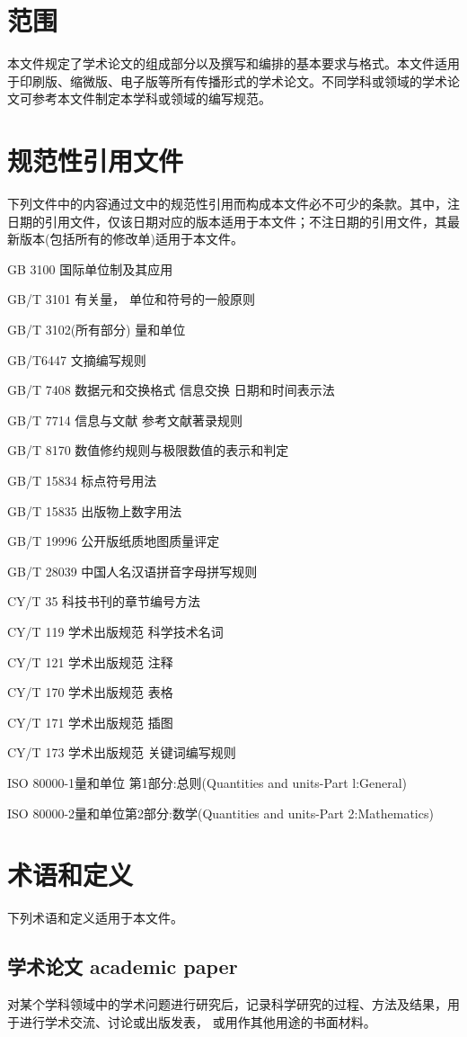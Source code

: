 \chapter{范围}

本文件规定了学术论文的组成部分以及撰写和编排的基本要求与格式。本文件适用于印刷版、缩微版、电子版等所有传播形式的学术论文。不同学科或领域的学术论文可参考本文件制定本学科或领域的编写规范。

\chapter{规范性引用文件}
下列文件中的内容通过文中的规范性引用而构成本文件必不可少的条款。其中，注日期的引用文件，仅该日期对应的版本适用于本文件；不注日期的引用文件，其最新版本(包括所有的修改单)适用于本文件。

GB 3100 国际单位制及其应用

GB/T 3101 有关量， 单位和符号的一般原则

GB/T 3102(所有部分) 量和单位

GB/T6447 文摘编写规则

GB/T 7408 数据元和交换格式 信息交换 日期和时间表示法

GB/T 7714 信息与文献 参考文献著录规则

GB/T 8170 数值修约规则与极限数值的表示和判定

GB/T 15834 标点符号用法

GB/T 15835 出版物上数字用法

GB/T 19996 公开版纸质地图质量评定

GB/T 28039 中国人名汉语拼音字母拼写规则

CY/T 35 科技书刊的章节编号方法

CY/T 119 学术出版规范 科学技术名词

CY/T 121 学术出版规范 注释

CY/T 170 学术出版规范 表格

CY/T 171 学术出版规范 插图

CY/T 173 学术出版规范 关键词编写规则

ISO 80000-1量和单位 第1部分:总则(Quantities and units-Part l:General)

ISO 80000-2量和单位第2部分:数学(Quantities and units-Part 2:Mathematics)


\chapter{术语和定义}
下列术语和定义适用于本文件。

\section{学术论文 academic paper}
对某个学科领域中的学术问题进行研究后，记录科学研究的过程、方法及结果，用于进行学术交流、讨论或出版发表， 或用作其他用途的书面材料。

